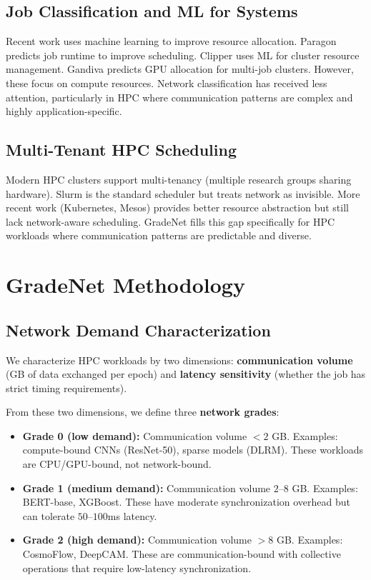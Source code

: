 \documentclass[conference]{IEEEtran}
\begin{document}
\subsection{Job Classification and ML for Systems}

Recent work uses machine learning to improve resource allocation. Paragon \cite{Paragon2013} predicts job runtime to improve scheduling. Clipper \cite{Clipper2017} uses ML for cluster resource management. Gandiva \cite{Gandiva2018} predicts GPU allocation for multi-job clusters. However, these focus on compute resources. Network classification has received less attention, particularly in HPC where communication patterns are complex and highly application-specific.

\subsection{Multi-Tenant HPC Scheduling}

Modern HPC clusters support multi-tenancy (multiple research groups sharing hardware). Slurm \cite{Slurm2006} is the standard scheduler but treats network as invisible. More recent work (Kubernetes, Mesos) provides better resource abstraction but still lack network-aware scheduling. GradeNet fills this gap specifically for HPC workloads where communication patterns are predictable and diverse.

\section{GradeNet Methodology}

\subsection{Network Demand Characterization}

We characterize HPC workloads by two dimensions: \textbf{communication volume} (GB of data exchanged per epoch) and \textbf{latency sensitivity} (whether the job has strict timing requirements).

From these two dimensions, we define three \textbf{network grades}:
\begin{itemize}
\item \textbf{Grade 0 (low demand):} Communication volume $<2$ GB. Examples: compute-bound CNNs (ResNet-50), sparse models (DLRM). These workloads are CPU/GPU-bound, not network-bound.
\item \textbf{Grade 1 (medium demand):} Communication volume $2$--$8$ GB. Examples: BERT-base, XGBoost. These have moderate synchronization overhead but can tolerate $50$--$100$ms latency.
\item \textbf{Grade 2 (high demand):} Communication volume $>8$ GB. Examples: CosmoFlow, DeepCAM. These are communication-bound with collective operations that require low-latency synchronization.
\end{itemize}
\end{document}

